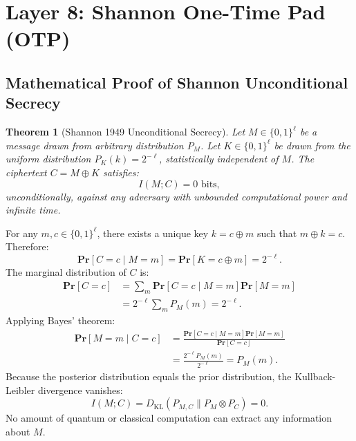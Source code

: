 \documentclass{ieeeaccess}
\renewcommand{\Pr}{\mathbf{Pr}}
\newtheorem{theorem}{Theorem}
\newenvironment{proof}{\begin{IEEEproof}\IEEEQEDoff}{\end{IEEEproof}}
\begin{document}
\section{Layer 8: Shannon One-Time Pad (OTP)}
\label{sec:L8}

\subsection{Mathematical Proof of Shannon Unconditional Secrecy}
\begin{theorem}[Shannon 1949 Unconditional Secrecy]
\label{thm:L8-shannon}
Let $M \in \{0,1\}^\ell$ be a message drawn from arbitrary distribution $P_M$. Let $K \in \{0,1\}^\ell$ be drawn from the uniform distribution $P_K(k) = 2^{-\ell}$, statistically independent of $M$.
The ciphertext $C = M \oplus K$ satisfies:
\begin{equation}
  I(M; C) = 0 \text{ bits},
\end{equation}
unconditionally, against any adversary with unbounded computational power and infinite time.
\end{theorem}
\begin{proof}
For any $m, c \in \{0,1\}^\ell$, there exists a unique key $k = c \oplus m$ such that $m \oplus k = c$. Therefore:
\begin{equation}
  \Pr[C = c \mid M = m] = \Pr[K = c \oplus m] = 2^{-\ell}.
\end{equation}
The marginal distribution of $C$ is:
\begin{equation}
\begin{aligned}
  \Pr[C = c] &= \sum_{m} \Pr[C=c \mid M=m]\Pr[M=m] \\
  &= 2^{-\ell} \sum_m P_M(m) = 2^{-\ell}.
\end{aligned}
\end{equation}
Applying Bayes' theorem:
\begin{equation}
\begin{aligned}
  \Pr[M = m \mid C = c] &= \frac{\Pr[C=c \mid M=m]\Pr[M=m]}{\Pr[C=c]} \\
  &= \frac{2^{-\ell} P_M(m)}{2^{-\ell}} = P_M(m).
\end{aligned}
\end{equation}
Because the posterior distribution equals the prior distribution, the Kullback-Leibler divergence vanishes:
\begin{equation}
  I(M; C) = D_{\mathrm{KL}}(P_{M,C} \parallel P_M \otimes P_C) = 0.
\end{equation}
No amount of quantum or classical computation can extract any information about $M$.
\end{proof}
\end{document}
